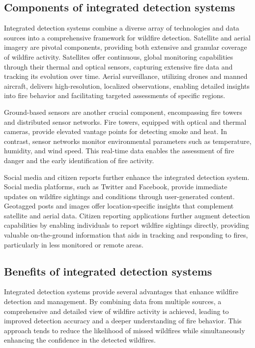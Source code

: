 \documentclass[
  12 pt,
]{Nemilov}
\begin{document}
\subsection{Components of integrated detection systems}\label{components-of-integrated-detection-systems}

Integrated detection systems combine a diverse array of technologies and data sources into a comprehensive framework for wildfire detection. Satellite and aerial imagery are pivotal components, providing both extensive and granular coverage of wildfire activity. Satellites offer continuous, global monitoring capabilities through their thermal and optical sensors, capturing extensive fire data and tracking its evolution over time. Aerial surveillance, utilizing drones and manned aircraft, delivers high-resolution, localized observations, enabling detailed insights into fire behavior and facilitating targeted assessments of specific regions.

Ground-based sensors are another crucial component, encompassing fire towers and distributed sensor networks. Fire towers, equipped with optical and thermal cameras, provide elevated vantage points for detecting smoke and heat. In contrast, sensor networks monitor environmental parameters such as temperature, humidity, and wind speed. This real-time data enables the assessment of fire danger and the early identification of fire activity.

Social media and citizen reports further enhance the integrated detection system. Social media platforms, such as Twitter and Facebook, provide immediate updates on wildfire sightings and conditions through user-generated content. Geotagged posts and images offer location-specific insights that complement satellite and aerial data. Citizen reporting applications further augment detection capabilities by enabling individuals to report wildfire sightings directly, providing valuable on-the-ground information that aids in tracking and responding to fires, particularly in less monitored or remote areas.

\subsection{Benefits of integrated detection systems}\label{benefits-of-integrated-detection-systems}

Integrated detection systems provide several advantages that enhance wildfire detection and management. By combining data from multiple sources, a comprehensive and detailed view of wildfire activity is achieved, leading to improved detection accuracy and a deeper understanding of fire behavior. This approach tends to reduce the likelihood of missed wildfires while simultaneously enhancing the confidence in the detected wildfires.
\end{document}
